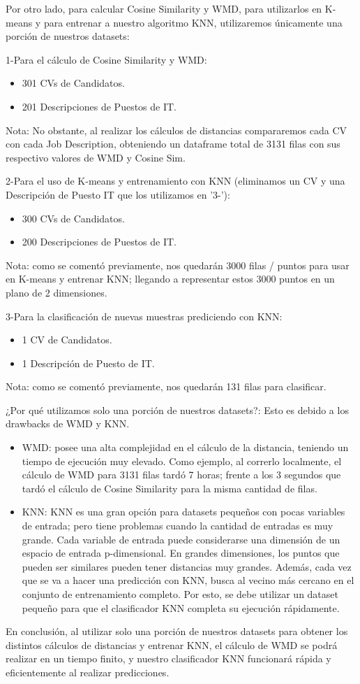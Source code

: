 \documentclass[12pt,a4paper]{article}
\begin{document}
Por otro lado, para calcular Cosine Similarity y WMD, para utilizarlos en K-means y para entrenar a nuestro algoritmo KNN, utilizaremos únicamente una porción de nuestros datasets:

1-Para el cálculo de Cosine Similarity y WMD:
\begin{itemize}
\item 301 CVs de Candidatos.
\item 201 Descripciones de Puestos de IT.
\end{itemize}
Nota: No obstante, al realizar los cálculos de distancias compararemos cada CV con cada Job Description, obteniendo un dataframe total de 3131 filas con sus respectivo valores de WMD y Cosine Sim.

2-Para el uso de K-means y entrenamiento con KNN (eliminamos un CV y una Descripción de Puesto IT que los utilizamos en '3-'):
\begin{itemize}
\item 300 CVs de Candidatos.
\item 200 Descripciones de Puestos de IT.
\end{itemize}        
Nota: como se comentó previamente, nos quedarán 3000 filas / puntos para usar en K-means y entrenar KNN; llegando a representar estos 3000 puntos en un plano de 2 dimensiones.

3-Para la clasificación de nuevas muestras prediciendo con KNN:
\begin{itemize}
\item 1 CV de Candidatos.
\item 1 Descripción de Puesto de IT.
\end{itemize}
Nota: como se comentó previamente, nos quedarán 131 filas para clasificar.

¿Por qué utilizamos solo una porción de nuestros datasets?: Esto es debido a los drawbacks de WMD y KNN.
\begin{itemize}
\item WMD: posee una alta complejidad en el cálculo de la distancia, teniendo un tiempo de ejecución muy elevado. Como ejemplo, al correrlo localmente, el cálculo de WMD para 3131 filas tardó 7 horas; frente a los 3 segundos que tardó el cálculo de Cosine Similarity para la misma cantidad de filas.
\item KNN: KNN es una gran opción para datasets pequeños con pocas variables de entrada; pero tiene problemas cuando la cantidad de entradas es muy grande. Cada variable de entrada puede considerarse una dimensión de un espacio de entrada p-dimensional. En grandes dimensiones, los puntos que pueden ser similares pueden tener distancias muy grandes. Además, cada vez que se va a hacer una predicción con KNN, busca al vecino más cercano en el conjunto de entrenamiento completo. Por esto, se debe utilizar un dataset pequeño para que el clasificador KNN completa su ejecución rápidamente.
\end{itemize}
En conclusión, al utilizar solo una porción de nuestros datasets para obtener los distintos cálculos de distancias y entrenar KNN, el cálculo de WMD se podrá realizar en un tiempo finito, y nuestro clasificador KNN funcionará rápida y eficientemente al realizar predicciones.
\end{document}
